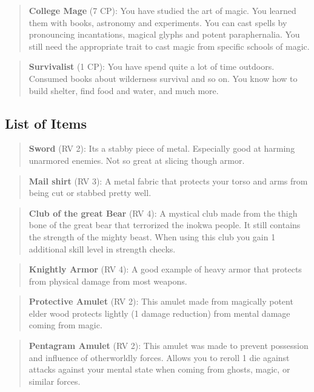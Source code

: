 \documentclass[11pt]{article}
\begin{document}
{\begin{multicols}{2}[]
\begin{quote}
\textbf{College Mage} (7 CP): You have studied the art of magic. You learned them with books, astronomy and experiments. You can cast spells by pronouncing incantations, magical glyphs and potent paraphernalia. You still need the appropriate trait to cast magic from specific schools of magic.
\end{quote}

\begin{quote}
\textbf{Survivalist} (1 CP): You have spend quite a lot of time outdoors. Consumed books about wilderness survival and so on. You know how to build shelter, find food and water, and much more. 
\end{quote}


\subsection{List of Items}
\label{sec:orgbe4412b}
\begin{quote}
\textbf{Sword} (RV 2): Its a stabby piece of metal. Especially good at harming unarmored enemies. Not so great at slicing though armor. 
\end{quote}

\begin{quote}
\textbf{Mail shirt} (RV 3): A metal fabric that protects your torso and arms from being cut or stabbed pretty well. 
\end{quote}

\begin{quote}
\textbf{Club of the great Bear} (RV 4): A mystical club made from the thigh bone of the great bear that terrorized the inokwa people. It still contains the strength of the mighty beast. When using this club you gain 1 additional skill level in strength checks.
\end{quote}

\begin{quote}
\textbf{Knightly Armor} (RV 4): A good example of heavy armor that protects from physical damage from most weapons.
\end{quote}

\begin{quote}
\textbf{Protective Amulet} (RV 2): This amulet made from magically potent elder wood protects lightly (1 damage reduction) from mental damage coming from magic.
\end{quote}

\begin{quote}
\textbf{Pentagram Amulet} (RV 2): This amulet was made to prevent possession and influence of otherworldly forces. Allows you to reroll 1 die against attacks against your mental state when coming from ghosts, magic, or similar forces.
\end{quote}


\end{multicols}}
\end{document}

